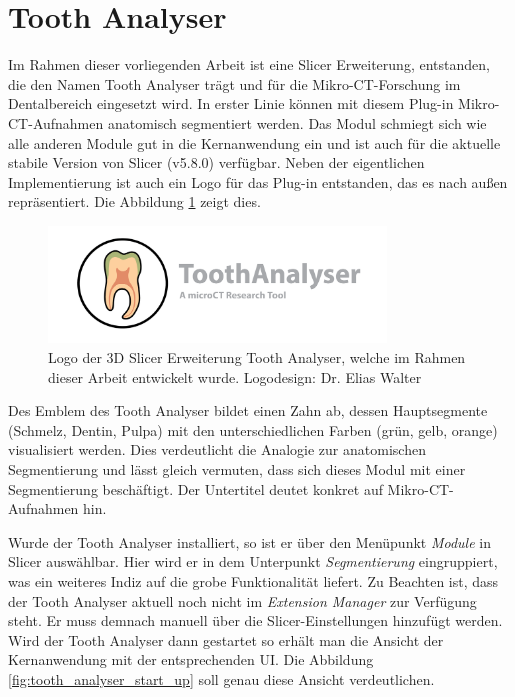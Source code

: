 \section{Tooth Analyser}
\label{sec:tooth_analyser} Im Rahmen dieser vorliegenden Arbeit ist eine Slicer Erweiterung,
entstanden, die den Namen Tooth Analyser trägt und für die Mikro-\ac{CT}-Forschung
im Dentalbereich eingesetzt wird. In erster Linie können mit diesem Plug-in Mikro-\ac{CT}-Aufnahmen
anatomisch segmentiert werden. Das Modul schmiegt sich wie alle anderen Module gut
in die Kernanwendung ein und ist auch für die aktuelle stabile Version von Slicer
(v5.8.0) verfügbar. Neben der eigentlichen Implementierung ist auch ein Logo für
das Plug-in entstanden, das es nach außen repräsentiert. Die Abbildung
\ref{fig:logo_tooth_analyser} zeigt dies.

\begin{figure}[h]
	\centering
	\includegraphics[width=0.8\textwidth]{img/SlicerToothAnalyser.png}
	\caption{Logo der 3D Slicer Erweiterung Tooth Analyser, welche im Rahmen dieser
	Arbeit entwickelt wurde. Logodesign: Dr. Elias Walter}
	\label{fig:logo_tooth_analyser}
\end{figure}

Des Emblem des Tooth Analyser bildet einen Zahn ab, dessen Hauptsegmente (Schmelz,
Dentin, Pulpa) mit den unterschiedlichen Farben (grün, gelb, orange)
visualisiert werden. Dies verdeutlicht die Analogie zur anatomischen Segmentierung
und lässt gleich vermuten, dass sich dieses Modul mit einer Segmentierung
beschäftigt. Der Untertitel deutet konkret auf Mikro-\ac{CT}-Aufnahmen hin.

Wurde der Tooth Analyser installiert, so ist er über den Menüpunkt \textit{Module}
in Slicer auswählbar. Hier wird er in dem Unterpunkt \textit{Segmentierung}
eingruppiert, was ein weiteres Indiz auf die grobe Funktionalität liefert. Zu
Beachten ist, dass der Tooth Analyser aktuell noch nicht im \textit{Extension
Manager} zur Verfügung steht. Er muss demnach manuell über die Slicer-Einstellungen
hinzufügt werden. Wird der Tooth Analyser dann gestartet so erhält man die
Ansicht der Kernanwendung mit der entsprechenden \ac{UI}. Die Abbildung
\ref{fig:tooth_analyser_start_up} soll genau diese Ansicht verdeutlichen.

